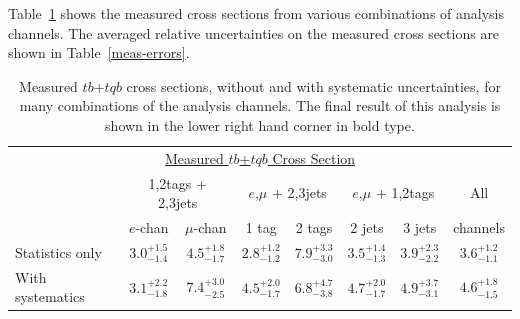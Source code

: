 Table~\ref{tab:measxsecs} shows the measured cross sections from
various combinations of analysis channels.  The averaged relative
uncertainties on the measured cross sections are shown in
Table~\ref{meas-errors}.

\begin{table}[!h!tbp]
\begin{center}
\begin{minipage}{5in}
\begin{ruledtabular}
\begin{tabular}{l|cc|cc|cc|c}
  \multicolumn{8}{c}{\hspace{0.5in}\underline{Measured $tb$+$tqb$ Cross Section}}\vspace{0.1in}\\
& \multicolumn{2}{c|}{1,2tags + 2,3jets}& \multicolumn{2}{c|}{$e$,$\mu$ + 2,3jets}
& \multicolumn{2}{c|}{$e$,$\mu$ + 1,2tags}& All \\
                 &  $e$-chan & $\mu$-chan& 1 tag & 2 tags& 2 jets& 3 jets&channels\\
\hline
Statistics only  &  $3.0^{+1.5}_{-1.4}$  & $4.5^{+1.8}_{-1.7}$ & $2.8^{+1.2}_{-1.2}$ & $7.9^{+3.3}_{-3.0}$ & $3.5^{+1.4}_{-1.3}$ & $3.9^{+2.3}_{-2.2}$ & $3.6^{+1.2}_{-1.1}$     \\
With systematics &  $3.1^{+2.2}_{-1.8}$  & $7.4^{+3.0}_{-2.5}$ & $4.5^{+2.0}_{-1.7}$ & $6.8^{+4.7}_{-3.8}$ & $4.7^{+2.0}_{-1.7}$ & $4.9^{+3.7}_{-3.1}$ & $\mathbf{4.6^{+1.8}_{-1.5}}$     \\
\end{tabular}
\end{ruledtabular}
\vspace{-0.1in}
\caption[measxsecs]{Measured $tb$+$tqb$ cross sections, without and
with systematic uncertainties, for many combinations of the analysis
channels. The final result of this analysis is shown in the lower
right hand corner in bold type.}
\label{tab:measxsecs}
\end{minipage}
\end{center}
\end{table}

